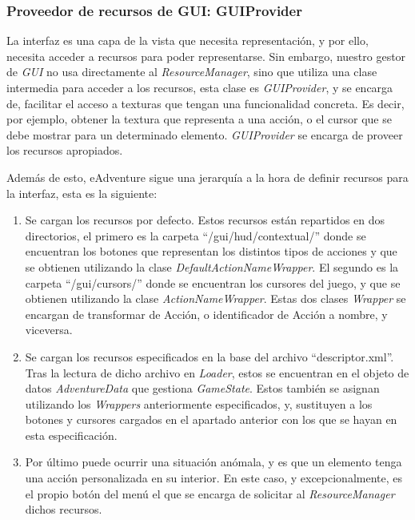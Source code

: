 \newpage

\subsubsection{Proveedor de recursos de GUI: GUIProvider}

La interfaz es una capa de la vista que necesita representación, y por ello, necesita acceder a recursos para poder representarse. Sin embargo, nuestro gestor de \textit{GUI} no usa directamente al \textit{ResourceManager}, sino que utiliza una clase intermedia para acceder a los recursos, esta clase es \textit{GUIProvider}, y se encarga de, facilitar el acceso a texturas que tengan una funcionalidad concreta. Es decir, por ejemplo, obtener la textura que representa a una acción, o el cursor que se debe mostrar para un determinado elemento. \textit{GUIProvider} se encarga de proveer los recursos apropiados.

Además de esto, eAdventure sigue una jerarquía a la hora de definir recursos para la interfaz, esta es la siguiente:

\begin{enumerate}
	\item Se cargan los recursos por defecto. Estos recursos están repartidos en dos directorios, el primero es la carpeta ``/gui/hud/contextual/'' donde se encuentran los botones que representan los distintos tipos de acciones y que se obtienen utilizando la clase \textit{DefaultActionNameWrapper}. El segundo es la carpeta ``/gui/cursors/'' donde se encuentran los cursores del juego, y que se obtienen utilizando la clase \textit{ActionNameWrapper}. Estas dos clases \textit{Wrapper} se encargan de transformar de Acción, o identificador de Acción a nombre, y viceversa.
	
	\item Se cargan los recursos especificados en la base del archivo ``descriptor.xml''. Tras la lectura de dicho archivo en \textit{Loader}, estos se encuentran en el objeto de datos \textit{AdventureData} que gestiona \textit{GameState}. Estos también se asignan utilizando los \textit{Wrappers} anteriormente especificados, y, sustituyen a los botones y cursores cargados en el apartado anterior con los que se hayan en esta especificación.
	
	\item Por último puede ocurrir una situación anómala, y es que un elemento tenga una acción personalizada en su interior. En este caso, y excepcionalmente, es el propio botón del menú el que se encarga de solicitar al \textit{ResourceManager} dichos recursos.
	
\end{enumerate}


